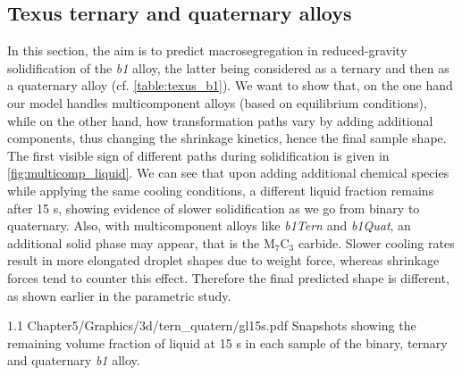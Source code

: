 \subsection{Texus ternary and quaternary alloys}

In this section, the aim is to predict macrosegregation in reduced-gravity solidification of the \emph{b1} alloy, the latter being considered 
as a ternary and then as a quaternary alloy (cf. \cref{table:texus_b1}). 
We want to show that, on the one hand our model handles multicomponent alloys (based on equilibrium conditions), while
on the other hand, how transformation paths vary by adding additional components, thus changing the shrinkage kinetics, hence the final sample shape.
The first visible sign of different paths during solidification is given in \cref{fig:multicomp_liquid}. We can see that upon adding
additional chemical species while applying the same cooling conditions, a different liquid fraction remains after 15 s, showing evidence 
of slower solidification as we go from binary to quaternary. Also, with multicomponent alloys like \emph{b1Tern} and \emph{b1Quat}, an additional solid
phase may appear, that is the M$_7$C$_3$ carbide.
Slower cooling rates result in more elongated droplet shapes due to weight force, whereas shrinkage forces tend to counter this effect.
Therefore the final predicted shape is different, as shown earlier in the parametric study.

\begin{figureth}
{1.1}
{Chapter5/Graphics/3d/tern_quatern/gl15s.pdf}
{Snapshots showing the remaining volume fraction of liquid at 15 s in each sample of the binary, ternary and quaternary \emph{b1} alloy.}
\label{fig:multicomp_liquid}
\end{figureth}

